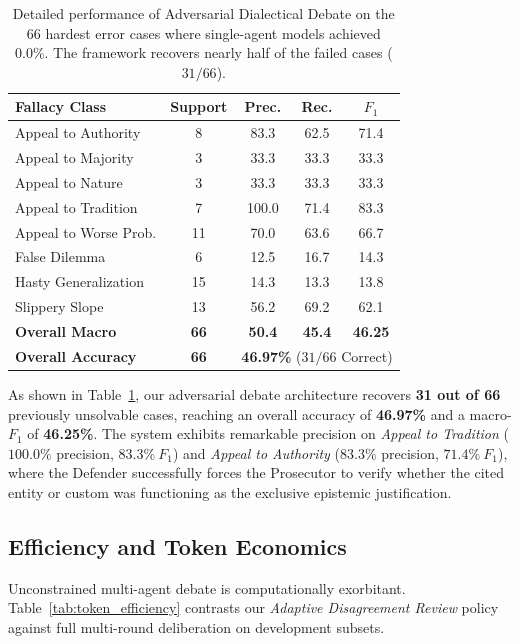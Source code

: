 \documentclass[11pt]{article}
\begin{document}
\begin{table}[h]
\centering
\small
\begin{tabular}{lcccc}
\toprule
\textbf{Fallacy Class} & \textbf{Support} & \textbf{Prec.} & \textbf{Rec.} & \textbf{$F_1$} \\
\midrule
Appeal to Authority & 8 & 83.3 & 62.5 & 71.4 \\
Appeal to Majority  & 3 & 33.3 & 33.3 & 33.3 \\
Appeal to Nature    & 3 & 33.3 & 33.3 & 33.3 \\
Appeal to Tradition & 7 & 100.0 & 71.4 & 83.3 \\
Appeal to Worse Prob. & 11 & 70.0 & 63.6 & 66.7 \\
False Dilemma       & 6 & 12.5 & 16.7 & 14.3 \\
Hasty Generalization & 15 & 14.3 & 13.3 & 13.8 \\
Slippery Slope      & 13 & 56.2 & 69.2 & 62.1 \\
\midrule
\textbf{Overall Macro} & \textbf{66} & \textbf{50.4} & \textbf{45.4} & \textbf{46.25} \\
\textbf{Overall Accuracy} & \textbf{66} & \multicolumn{3}{c}{\textbf{46.97\%} ($31/66$ Correct)} \\
\bottomrule
\end{tabular}
\caption{Detailed performance of Adversarial Dialectical Debate on the 66 hardest error cases where single-agent models achieved 0.0\%. The framework recovers nearly half of the failed cases ($31/66$).}
\label{tab:adversarial_results}
\end{table}

As shown in Table~\ref{tab:adversarial_results}, our adversarial debate architecture recovers \textbf{31 out of 66} previously unsolvable cases, reaching an overall accuracy of \textbf{46.97\%} and a macro-$F_1$ of \textbf{46.25\%}. The system exhibits remarkable precision on \textit{Appeal to Tradition} ($100.0\%$ precision, $83.3\%~F_1$) and \textit{Appeal to Authority} ($83.3\%$ precision, $71.4\%~F_1$), where the Defender successfully forces the Prosecutor to verify whether the cited entity or custom was functioning as the exclusive epistemic justification.

\subsection{Efficiency and Token Economics}
Unconstrained multi-agent debate is computationally exorbitant. Table~\ref{tab:token_efficiency} contrasts our \textit{Adaptive Disagreement Review} policy against full multi-round deliberation on development subsets.
\end{document}
